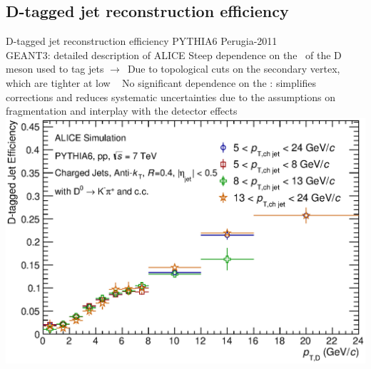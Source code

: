 \documentclass{beamer}
\begin{document}
\subsection{D-tagged jet reconstruction efficiency}
\begin{frame}{D-tagged jet reconstruction efficiency}
PYTHIA6 Perugia-2011\\
GEANT3: detailed description of ALICE
\newline
\newline
Steep dependence on the \pt\ of the D meson used to tag jets
\newline
\newline
$\rightarrow$~Due to topological cuts on the secondary vertex, which are tighter at low \ptd\
\newline
\newline
No significant dependence on the \ptchjet: simplifies corrections and reduces systematic uncertainties 
due to the assumptions on fragmentation and interplay with the detector effects
\includegraphics[width=.3\paperwidth]{img/HQ16_Simulation_EfficiencyVsDPt}
\end{frame}
\end{document}
